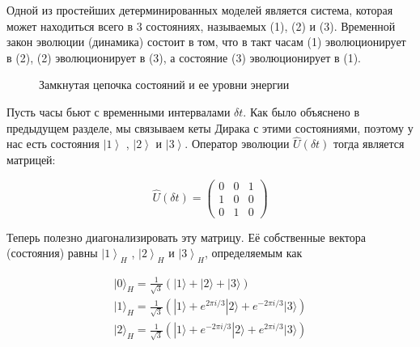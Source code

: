 \documentclass[main.tex]{subfiles}
\begin{document}
Одной из простейших детерминированных моделей является система, которая может находиться всего в 3 состояниях, называемых (1), (2) и (3). Временной закон эволюции (динамика) состоит в том, что в такт часам (1) эволюционирует в (2), (2) эволюционирует в (3), а состояние (3) эволюционирует в (1). 

\begin{figure}[ht] %
\begin{center}
\caption{
\label{i2.1}Замкнутая цепочка состояний и ее уровни энергии}
\end {center}
\end {figure}

Пусть часы бьют с временными интервалами $\delta t$. Как было объяснено в предыдущем разделе, мы связываем кеты Дирака с этими состояниями, поэтому у нас есть состояния $\left|1\right>$ , $\left|2\right>$ и $\left|3\right>$. Оператор эволюции $\hat U(\delta t)$ тогда является матрицей:

\begin{equation}\label{2.13}
	\hat U(\delta t)=\left(\begin{array}{lll}{0} & {0} & {1} \\ {1} & {0} & {0} \\ {0} & {1} & {0}\end{array}\right)
\end{equation}

Теперь полезно диагонализировать эту матрицу. Её собственные вектора (состояния) равны $\left|1\right>_H$ , $\left|2\right>_H$ и $\left|3\right>_H$, определяемым как

\begin{equation}\label{2.14}
	\begin{array}{l}{|0\rangle_{H}=\frac{1}{\sqrt{3}}(|1\rangle+|2\rangle+|3\rangle)} \\ {|1\rangle_{H}=\frac{1}{\sqrt{3}}\left(|1\rangle+ e^{2 \pi i / 3}|2\rangle+ e^{-2 \pi i / 3}|3\rangle\right)} \\ {|2\rangle_{H}=\frac{1}{\sqrt{3}}\left(|1\rangle+ e^{-2 \pi i / 3}|2\rangle+ e^{2 \pi i / 3}|3\rangle\right)}\end{array}
\end{equation}
\end{document}
